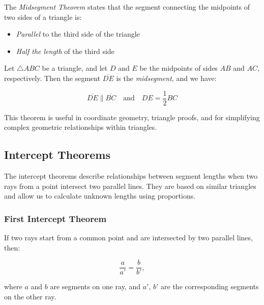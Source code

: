 The \emph{Midsegment Theorem} states that the segment connecting the midpoints of two sides of a triangle 
is:

\begin{itemize}

	\item \emph{Parallel} to the third side of the triangle

	\item \emph{Half the length} of the third side

\end{itemize}

Let \( \triangle ABC \) be a triangle, and let \( D \) and \( E \) be the 
midpoints of sides \( AB \) and \( AC \), respectively. Then the segment \( \overline{DE} \) is 
the \emph{midsegment}, and we have:

\[
	\overline{DE} \parallel \overline{BC} \quad \text{and} \quad DE = \frac{1}{2} BC
\]

This theorem is useful in coordinate geometry, triangle proofs, 
and for simplifying complex geometric relationships within triangles.

\subsection{Intercept Theorems}

The intercept theorems describe relationships between segment lengths when two rays from a point intersect 
two parallel lines. They are based on similar triangles and allow us to calculate unknown lengths using 
proportions.

\subsubsection{First Intercept Theorem}

If two rays start from a common point and are intersected by two parallel lines, then:

\[
	\frac{a}{a'} = \frac{b}{b'},
\]

where \(a\) and \(b\) are segments on one ray, and \(a'\), \(b'\) are the corresponding segments on the 
other ray.

